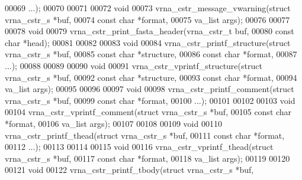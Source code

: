 \begin{DoxyCode}
00069                           ...);
00070 
00071 
00072 \textcolor{keywordtype}{void}
00073 vrna\_cstr\_message\_vwarning(\textcolor{keyword}{struct} vrna\_cstr\_s *buf,
00074                            \textcolor{keyword}{const} \textcolor{keywordtype}{char}         *format,
00075                            va\_list            args);
00076 
00077 
00078 \textcolor{keywordtype}{void}
00079 vrna\_cstr\_print\_fasta\_header(vrna\_cstr\_t  buf,
00080                              \textcolor{keyword}{const} \textcolor{keywordtype}{char}   *head);
00081 
00082 
00083 \textcolor{keywordtype}{void}
00084 vrna\_cstr\_printf\_structure(\textcolor{keyword}{struct} vrna\_cstr\_s *buf,
00085                            \textcolor{keyword}{const} \textcolor{keywordtype}{char}         *structure,
00086                            \textcolor{keyword}{const} \textcolor{keywordtype}{char}         *format,
00087                            ...);
00088 
00089 
00090 \textcolor{keywordtype}{void}
00091 vrna\_cstr\_vprintf\_structure(\textcolor{keyword}{struct} vrna\_cstr\_s  *buf,
00092                             \textcolor{keyword}{const} \textcolor{keywordtype}{char}          *structure,
00093                             \textcolor{keyword}{const} \textcolor{keywordtype}{char}          *format,
00094                             va\_list             args);
00095 
00096 
00097 \textcolor{keywordtype}{void}
00098 vrna\_cstr\_printf\_comment(\textcolor{keyword}{struct} vrna\_cstr\_s *buf,
00099                          \textcolor{keyword}{const} \textcolor{keywordtype}{char}         *format,
00100                          ...);
00101 
00102 
00103 \textcolor{keywordtype}{void}
00104 vrna\_cstr\_vprintf\_comment(\textcolor{keyword}{struct} vrna\_cstr\_s  *buf,
00105                           \textcolor{keyword}{const} \textcolor{keywordtype}{char}          *format,
00106                           va\_list             args);
00107 
00108 
00109 \textcolor{keywordtype}{void}
00110 vrna\_cstr\_printf\_thead(\textcolor{keyword}{struct} vrna\_cstr\_s *buf,
00111                        \textcolor{keyword}{const} \textcolor{keywordtype}{char}         *format,
00112                        ...);
00113 
00114 
00115 \textcolor{keywordtype}{void}
00116 vrna\_cstr\_vprintf\_thead(\textcolor{keyword}{struct} vrna\_cstr\_s  *buf,
00117                         \textcolor{keyword}{const} \textcolor{keywordtype}{char}          *format,
00118                         va\_list             args);
00119 
00120 
00121 \textcolor{keywordtype}{void}
00122 vrna\_cstr\_printf\_tbody(\textcolor{keyword}{struct} vrna\_cstr\_s *buf,

\end{DoxyCode}
